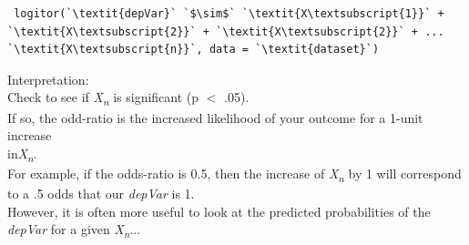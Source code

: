 \documentclass[12pt,letterpaper]{article}
\newcommand{\ind}{\phantom{AA}}
\begin{document}
\begin{tcolorbox}[title = Logistic Regression]
\begin{lstlisting}
 logitor(`\textit{depVar}` `$\sim$` `\textit{X\textsubscript{1}}` + `\textit{X\textsubscript{2}}` + `\textit{X\textsubscript{2}}` + ... `\textit{X\textsubscript{n}}`, data = `\textit{dataset}`)
\end{lstlisting}
Interpretation:\\
\ind Check to see if \textit{X\textsubscript{n}} is significant (p $<$ .05).\\
\ind If so, the odd-ratio is the increased likelihood of your outcome for a 1-unit increase \\ \ind \ind in\textit{X\textsubscript{n}}. \\
\ind For example, if the odds-ratio is 0.5, then the increase of \textit{X\textsubscript{n}} by 1 will correspond\\ \ind \ind  to a .5 odds that our \textit{depVar} is 1.\\
\ind However, it is often more useful to look at the predicted probabilities of the \\ \ind \ind \textit{depVar} for a given \textit{X\textsubscript{n}}...
\end{tcolorbox}
\end{document}
